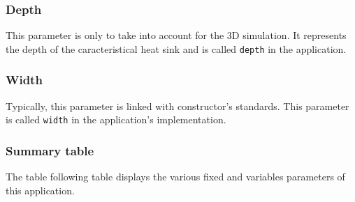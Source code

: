 \subsubsection{Depth}
This parameter is only to take into account for the 3D simulation. It represents the depth of the caracteristical heat sink and is called \lstinline!depth! in the application.

\subsubsection{Width}
Typically, this parameter is linked with constructor's standards. This parameter is called \lstinline!width! in the application's implementation.

\subsubsection{Summary table}
The table following table displays the various fixed and variables parameters of this application.
\clearpage

